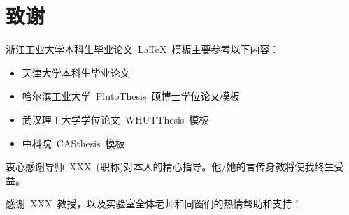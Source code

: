 
\chapter*{致\quad 谢}

浙江工业大学本科生毕业论文~\LaTeX~模板主要参考以下内容：
\begin{itemize}
  \item 天津大学本科生毕业论文
  \item 哈尔滨工业大学~PlutoThesis~硕博士学位论文模板
  \item 武汉理工大学学位论文~WHUTThesis~模板
  \item 中科院~CASthesis~模板
\end{itemize}

\vspace*{1em}

衷心感谢导师~XXX~(职称)对本人的精心指导。他/她的言传身教将使我终生受益。

感谢~XXX~教授，以及实验室全体老师和同窗们的热情帮助和支持！





